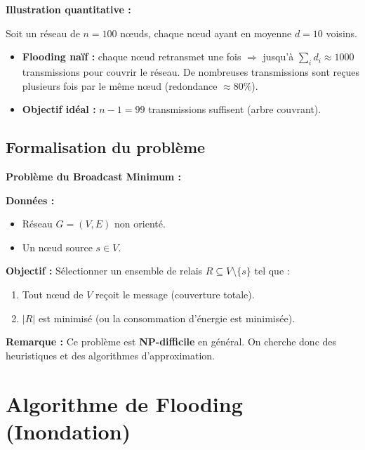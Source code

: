 \documentclass[12pt,a4paper]{article}
\begin{document}
\begin{exemple}
\textbf{Illustration quantitative :}

Soit un réseau de $n = 100$ nœuds, chaque nœud ayant en moyenne $d = 10$ voisins.

\begin{itemize}
    \item \textbf{Flooding naïf :} chaque nœud retransmet une fois $\Rightarrow$ jusqu'à
          $\sum_{i} d_i \approx 1000$ transmissions pour couvrir le réseau. De nombreuses
          transmissions sont reçues plusieurs fois par le même nœud (redondance $\approx 80\%$).
    \item \textbf{Objectif idéal :} $n - 1 = 99$ transmissions suffisent (arbre couvrant).
\end{itemize}
\end{exemple}

\subsection{Formalisation du problème}

\begin{definition}
\textbf{Problème du Broadcast Minimum :}

\textbf{Données :}
\begin{itemize}
    \item Réseau $G = (V, E)$ non orienté.
    \item Un nœud source $s \in V$.
\end{itemize}

\textbf{Objectif :} Sélectionner un ensemble de relais $R \subseteq V \setminus \{s\}$ tel que :
\begin{enumerate}
    \item Tout nœud de $V$ reçoit le message (couverture totale).
    \item $|R|$ est minimisé (ou la consommation d'énergie est minimisée).
\end{enumerate}

\textbf{Remarque :} Ce problème est \textcolor{importantrouge}{\textbf{NP-difficile}} en général.
On cherche donc des heuristiques et des algorithmes d'approximation.
\end{definition}

\newpage

\section{Algorithme de Flooding (Inondation)}
\end{document}
